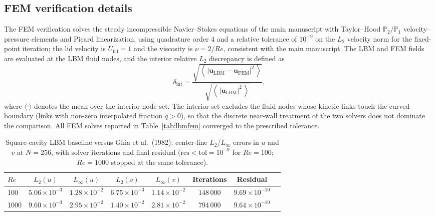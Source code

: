 \documentclass[11pt]{article}
\begin{document}
\subsection{FEM verification details}
The FEM verification solves the steady incompressible Navier--Stokes
equations of the main manuscript with Taylor--Hood $\mathbb{P}_2/\mathbb{P}_1$
velocity--pressure elements and Picard linearization, using quadrature order
4 and a relative tolerance of $10^{-9}$ on the $L_2$ velocity norm for the
fixed-point iteration; the lid velocity is $U_{\mathrm{lid}}=1$ and the
viscosity is $\nu=2/Re$, consistent with the main manuscript. The LBM and FEM
fields are evaluated at the LBM fluid nodes, and the interior relative $L_2$
discrepancy is defined as
\[
\delta_{\mathrm{int}} =
\frac{\sqrt{\left\langle\,|\mathbf{u}_{\mathrm{LBM}}-\mathbf{u}_{\mathrm{FEM}}|^{2}\,\right\rangle}}
{\sqrt{\left\langle\,|\mathbf{u}_{\mathrm{LBM}}|^{2}\,\right\rangle}},
\]
where $\langle\cdot\rangle$ denotes the mean over the interior node set. The
interior set excludes the fluid nodes whose kinetic links touch the curved
boundary (links with non-zero interpolated fraction $q>0$), so that the
discrete near-wall treatment of the two solvers does not dominate the
comparison. All FEM solves reported in Table~\ref{tab:lbmfem} converged to the
prescribed tolerance.


\begin{table}[H]
\centering
\caption{Square-cavity LBM baseline versus Ghia et al.\ (1982):
center-line $L_2$/$L_\infty$ errors in $u$ and $v$ at $N=256$, with solver
iterations and final residual ($\mathrm{res}<\mathrm{tol}=10^{-9}$ for
$Re=100$; $Re=1000$ stopped at the same tolerance).}




\label{tab:ghia}
\begin{tabular}{@{}lccccccc@{}}
\toprule
$Re$ & $L_2(u)$ & $L_\infty(u)$ & $L_2(v)$ & $L_\infty(v)$ & Iterations & Residual \\
\midrule
100   & $5.06\times10^{-3}$ & $1.28\times10^{-2}$ & $6.75\times10^{-3}$ &
$1.14\times10^{-2}$ & 148\,000 & $9.69\times10^{-10}$ \\
1000  & $9.60\times10^{-3}$ & $2.95\times10^{-2}$ & $1.40\times10^{-2}$ &
$2.81\times10^{-2}$ & 794\,000 & $9.64\times10^{-10}$ \\
\bottomrule
\end{tabular}
\end{table}
\par
\end{document}
